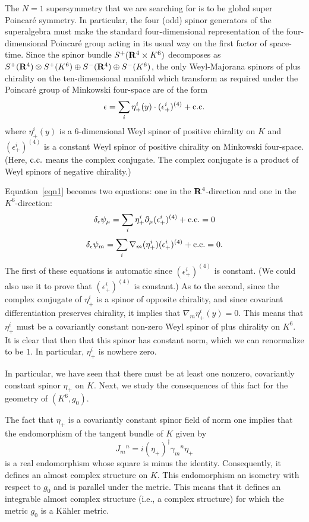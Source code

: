 The $N=1$ supersymmetry that we are searching for is
to be  global super Poincar\'e symmetry.  In particular, the four
(odd) spinor generators of the superalgebra must make the standard
four-dimensional representation of the four-dimensional Poincar\'e
group acting in its usual way on the first factor of space-time. 
Since the spinor bundle $S^+({\bf R}^4\times K^6)$
decomposes as $S^+({\bf R}^4)\otimes S^+(K^6)\oplus S^-({\bf 
R}^4)\oplus S^-(K^6)$, the only Weyl-Majorana spinors of plus
chirality on the ten-dimensional manifold which transform as required
under the  Poincar\'e group of Minkowski four-space are
of the form  
$$\epsilon=\sum_i\eta^i_+(y)\cdot (\epsilon^i_+)^{(4)} + {\rm c.c.}$$
where $\eta^i_+(y)$ is a $6$-dimensional Weyl spinor  of positive
chirality on $K$ and
$(\epsilon^i_+)^{(4)}$ is a constant Weyl spinor of positive chirality on
Minkowski four-space.
(Here, ${\rm c.c.}$ means the complex conjugate.  The complex
conjugate  is a product of
Weyl spinors of negative chirality.)

Equation~\ref{eqn1} becomes two equations: one in the ${\bf
R}^4$-direction and one in the $K^6$-direction:
$$\delta_\epsilon\psi_\mu=\sum_i\eta_+^i\partial_\mu(\epsilon_+^i)^{(4)}
+ {\rm c.c.} =0$$
$$\delta_\epsilon\psi_m=\sum_i\nabla_m(\eta^i_+)(\epsilon^i_+)^{(4)}+ {\rm
c.c.}=0.$$ 
The first of these equations is automatic since $(\epsilon^i_+)^{(4)}$ is
constant. 
(We could also use it to prove that $(\epsilon^i_+)^{(4)}$ is constant.)
As to the second, since the complex conjugate of $\eta^i_+$ is
a spinor of opposite chirality, and since covariant differentiation
preserves chirality, it implies that
$\nabla_m\eta^i_+(y)=0$. 
This means that $\eta^i_+$ must be a covariantly constant
non-zero Weyl spinor of plus chirality on $K^6$.
It is clear that then that this spinor has constant norm, which we can
renormalize to be $1$.  In particular, $\eta^i_+$ is
nowhere zero.

In particular, we have seen that there must be at least one nonzero,
covariantly constant spinor $\eta_+$ on $K$.
Next,  we study the consequences of this fact  for the geometry of
$(K^6,g_0)$.




\begin{claim} The fact that $\eta_+$ is a covariantly constant spinor
field of norm one implies that 
the endomorphism of the tangent bundle of $K$ given by
$$J_m{}^n=i(\eta_+)^\dagger\gamma_m{}^n\eta_+$$
is a real endomorphism whose square is minus the identity.
Consequently, it defines an almost complex structure on $K$. This
endomorphism an isometry with respect to $g_0$
and is parallel under the metric.  This means that it defines an
integrable almost complex structure (i.e., a complex structure) for
which the metric $g_0$ is a K\"ahler metric.
\end{claim}

